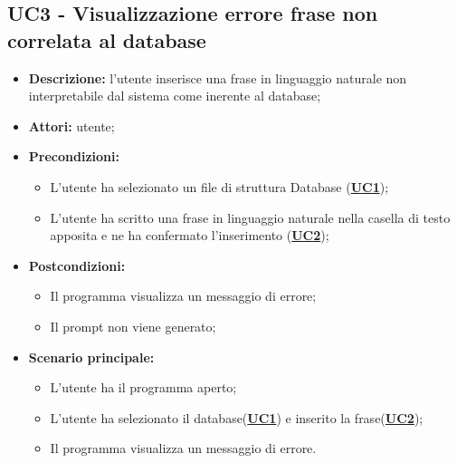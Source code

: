 \documentclass[5pt]{article}
\begin{document}
\subsection{UC3 - Visualizzazione errore frase non correlata al database}
\label{sec:UC3}
\begin{itemize}
    \item \textbf{Descrizione:} l’utente inserisce una frase in linguaggio naturale non interpretabile dal sistema come inerente al database;
    \item \textbf{Attori:} utente;
    \item \textbf{Precondizioni:} 
    \begin{itemize}
        \item L’utente ha selezionato un file di struttura Database (\hyperref[sec:UC1]{\textbf{UC1}});
        \item L’utente ha scritto una frase in linguaggio naturale nella casella di testo apposita e ne ha confermato l’inserimento (\hyperref[sec:UC2]{\textbf{UC2}});
    \end{itemize}
    \item \textbf{Postcondizioni:} 
    \begin{itemize}
        \item Il programma visualizza un messaggio di errore;
        \item Il prompt non viene generato;
    \end{itemize}
    \item \textbf{Scenario principale:} 
    \begin{itemize}
        \item L’utente ha il programma aperto;
        \item L’utente ha selezionato il database(\hyperref[sec:UC1]{\textbf{UC1}}) e inserito la frase(\hyperref[sec:UC2]{\textbf{UC2}});
        \item Il programma visualizza un messaggio di errore.
    \end{itemize}
\end{itemize}
\end{document}
